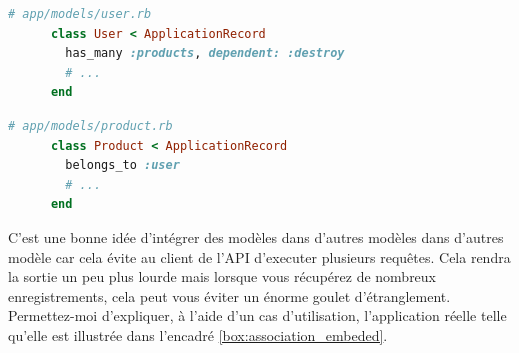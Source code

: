 \documentclass[]{report}
\begin{document}
    \begin{scriptsize}
      \begin{lstlisting}[language=ruby, caption={Associations des utilisateurs}, label={lst:user_assocations}]
      # app/models/user.rb
      class User < ApplicationRecord
        has_many :products, dependent: :destroy
        # ...
      end
      \end{lstlisting}
    \end{scriptsize}

    \begin{scriptsize}
      \begin{lstlisting}[language=ruby, caption={Associations des produits}, label={lst:product_assocations}]
      # app/models/product.rb
      class Product < ApplicationRecord
        belongs_to :user
        # ...
      end
      \end{lstlisting}
    \end{scriptsize}

    C'est une bonne idée d'intégrer des modèles dans d'autres modèles dans d'autres modèle car cela évite au client de l'API d'executer plusieurs requêtes. Cela rendra la sortie un peu plus lourde mais lorsque vous récupérez de nombreux enregistrements, cela peut vous éviter un énorme goulet d'étranglement. Permettez-moi d'expliquer, à l'aide d'un cas d'utilisation, l'application réelle telle qu'elle est illustrée dans l'encadré \ref{box:association_embeded}.
\end{document}
